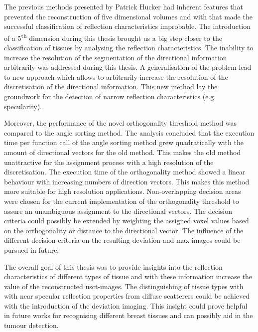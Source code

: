 The previous methods presented by Patrick Hucker \cite{PatrickHucker2014EvaluationRuckstreumodells} had inherent features that prevented the reconstruction of five dimensional volumes and with that made the successful classification of reflection characteristics improbable. The introduction of a 5\textsuperscript{th} dimension during this thesis brought us a big step closer to the classification of tissues by analysing the reflection characteristics. The inability to increase the resolution of the segmentation of the directional information arbitrarily was addressed during this thesis. A generalisation of the problem lead to new approach which allows to arbitrarily increase the resolution of the discretisation of the directional information. This new method lay the  groundwork for the detection of narrow reflection characteristics (e.g. specularity).

Moreover, the performance of the novel orthogonality threshold method was compared to the angle sorting method. The analysis concluded that the execution time per function call of the angle sorting method grew quadratically with the amount of directional vectors for the old method. This makes the old method unattractive for the assignment process with a high resolution of the discretisation. The execution time of the orthogonality method showed a linear behaviour with increasing numbers of direction vectors. This makes this method more suitable for high resolution applications. Non-overlapping decision areas were chosen for the current implementation of the orthogonality threshold to assure an unambiguous assignment to the directional vectors. The decision criteria could possibly be extended by weighting the assigned voxel values based on the orthogonality or distance to the directional vector. The influence of the different decision criteria on the resulting deviation and max images could be pursued in future.


The overall goal of this thesis was to provide insights into the reflection characteristics of different types of tissue and with these information increase the value of the reconstructed \ac{usct}-images. The distinguishing of tissue types with with near specular reflection properties from diffuse scatterers could be achieved with the introduction of the deviation imaging. This insight could prove helpful in future works for recognising different breast tissues and can possibly aid in the tumour detection.









